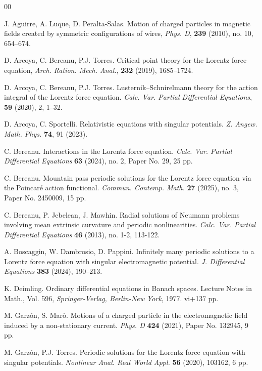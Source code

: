 \documentclass{article}
\theoremstyle{definition}
\begin{document}
\begin{thebibliography}{00}
		
		 J. Aguirre, A. Luque, D. Peralta-Salas. Motion of charged particles in magnetic fields created by symmetric configurations of wires, \textsl{Phys. D}, {\bf 239} (2010), no. 10, 654--674.   
		
		 D. Arcoya, C. Bereanu, P.J. Torres. Critical point theory for the Lorentz force equation, \textsl{Arch. Ration. Mech. Anal.}, {\bf 232} (2019), 1685--1724.
		
		 D. Arcoya, C. Bereanu, P.J. Torres. Lusternik–Schnirelmann theory for the action integral of the Lorentz force equation. \textsl{Calc. Var. Partial Differential Equations},  {\bf 59} (2020), 2, 1--32.

        D. Arcoya, C. Sportelli. Relativistic equations with singular potentials. \textsl{Z. Angew. Math. Phys.} {\bf 74}, 91 (2023).

         C. Bereanu. Interactions in the Lorentz force equation. \textsl{Calc. Var. Partial Differential Equations} {\bf 63} (2024), no. 2, Paper No. 29, 25 pp.

         C. Bereanu. Mountain pass periodic solutions for the Lorentz force equation via the Poincar\'e action functional. \textsl{Commun. Contemp. Math.} {\bf 27} (2025), no. 3, Paper No. 2450009, 15 pp.
        
         C. Bereanu, P. Jebelean, J. Mawhin. Radial solutions of Neumann problems involving mean extrinsic curvature and periodic nonlinearities. \textsl{Calc. Var. Partial Differential Equations} {\bf 46} (2013), no. 1-2, 113-122.

		 A. Boscaggin, W. Dambrosio, D. Pappini. Infinitely many periodic solutions to a Lorentz force equation with singular electromagnetic potential. \textsl{J. Differential Equations} {\bf 383} (2024), 190--213.

         K. Deimling. Ordinary differential equations in Banach spaces. Lecture Notes in Math., Vol. 596, \textsl{Springer-Verlag, Berlin-New York}, 1977. vi+137 pp.

		 M. Garz\'on, S. Marò. Motions of a charged particle in the electromagnetic field induced by a non-stationary current. \textsl{Phys. D} {\bf 424} (2021), Paper No. 132945, 9 pp.
        
		 M. Garz\'on, P.J. Torres. Periodic solutions for the Lorentz force equation with singular potentials. \textsl{Nonlinear Anal. Real World Appl.} {\bf 56} (2020), 103162, 6 pp.
		

\end{thebibliography}
\end{document}
